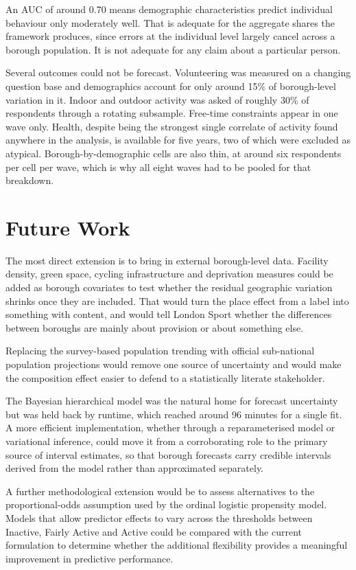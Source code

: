 \documentclass[ %
                    author={Ashrey Ashrey, Sanya Kapoor, Trisha Sharma, Yash Bhooshan Pandloskar},
                supervisor={Dr. Dalila O’Grady},
                    degree={MSc},
                     title={Using machine learning to forecast physical activity participation, volunteering and activity patterns in London},
                  subtitle={},
                      type={},
                      year={2021}]{dissertation}
\begin{document}
An AUC of around 0.70 means demographic characteristics predict individual behaviour only moderately well. That is adequate for the aggregate shares the framework produces, since errors at the individual level largely cancel across a borough population. It is not adequate for any claim about a particular person.

Several outcomes could not be forecast. Volunteering was measured on a changing question base and demographics account for only around 15\% of borough-level variation in it. Indoor and outdoor activity was asked of roughly 30\% of respondents through a rotating subsample. Free-time constraints appear in one wave only. Health, despite being the strongest single correlate of activity found anywhere in the analysis, is available for five years, two of which were excluded as atypical. Borough-by-demographic cells are also thin, at around six respondents per cell per wave, which is why all eight waves had to be pooled for that breakdown.

\section{Future Work}

The most direct extension is to bring in external borough-level data. Facility density, green space, cycling infrastructure and deprivation measures could be added as borough covariates to test whether the residual geographic variation shrinks once they are included. That would turn the place effect from a label into something with content, and would tell London Sport whether the differences between boroughs are mainly about provision or about something else.

Replacing the survey-based population trending with official sub-national population projections would remove one source of uncertainty and would make the composition effect easier to defend to a statistically literate stakeholder.

The Bayesian hierarchical model was the natural home for forecast uncertainty but was held back by runtime, which reached around 96 minutes for a single fit. A more efficient implementation, whether through a reparameterised model or variational inference, could move it from a corroborating role to the primary source of interval estimates, so that borough forecasts carry credible intervals derived from the model rather than approximated separately.

A further methodological extension would be to assess alternatives to the proportional-odds assumption used by the ordinal logistic propensity model. Models that allow predictor effects to vary across the thresholds between Inactive, Fairly Active and Active could be compared with the current formulation to determine whether the additional flexibility provides a meaningful improvement in predictive performance.
\end{document}
